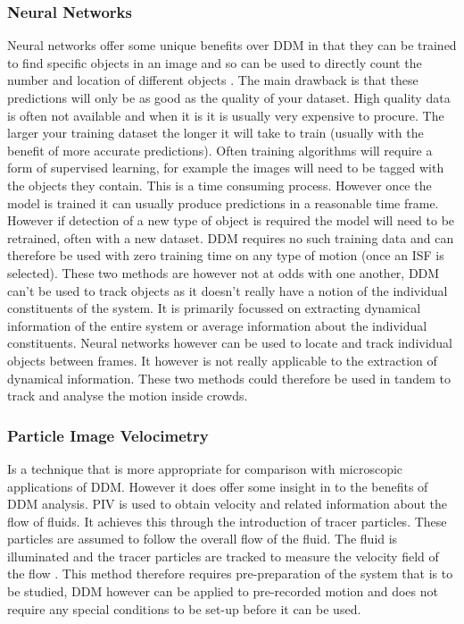\documentclass[11pt]{article}
\begin{document}
\subsubsection{Neural Networks}
Neural networks offer some unique benefits over DDM in that they can be trained to find specific objects in an image and so can be used to directly count the number and location of different objects \cite{yolov3}. The main drawback is that these predictions will only be as good as the quality of your dataset. High quality data is often not available and when it is it is usually very expensive to procure. The larger your training dataset the longer it will take to train (usually with the benefit of more accurate predictions). Often training algorithms will require a form of supervised learning, for example the images will need to be tagged with the objects they contain. This is a time consuming process. However once the model is trained it can usually produce predictions in a reasonable time frame. However if detection of a new type of object is required the model will need to be retrained, often with a new dataset. \cite{tensorflow} DDM requires no such training data and can therefore be used with zero training time on any type of motion (once an ISF is selected). These two methods are however not at odds with one another, DDM can't be used to track objects as it doesn't really have a notion of the individual constituents of the system. It is primarily focussed on extracting dynamical information of the entire system or average information about the individual constituents. Neural networks however can be used to locate and track individual objects between frames. It however is not really applicable to the extraction of dynamical information. These two methods could therefore be used in tandem to track and analyse the motion inside crowds.

\subsubsection{Particle Image Velocimetry}
Is a technique that is more appropriate for comparison with microscopic applications of DDM. However it does offer some insight in to the benefits of DDM analysis. PIV is used to obtain velocity and related information about the flow of fluids. It achieves this through the introduction of tracer particles. These particles are assumed to follow the overall flow of the fluid. The fluid is illuminated and the tracer particles are tracked to measure the velocity field of the flow \cite{piv}. This method therefore requires pre-preparation of the system that is to be studied, DDM however can be applied to pre-recorded motion and does not require any special conditions to be set-up before it can be used. 
\end{document}
